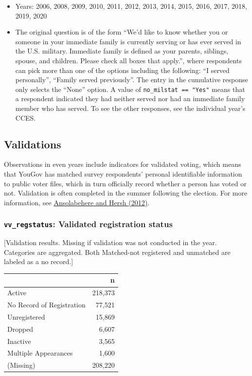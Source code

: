 \documentclass[10pt,article,oneside]{memoir}
\theoremstyle{definition}
\begin{document}
\begin{itemize}
\tightlist
\item
  Years: 2006, 2008, 2009, 2010, 2011, 2012, 2013, 2014, 2015, 2016,
  2017, 2018, 2019, 2020
\item
  The original question is of the form ``We'd like to know whether you
  or someone in your immediate family is currently serving or has ever
  served in the U.S. military. Immediate family is defined as your
  parents, siblings, spouse, and children. Please check all boxes that
  apply.'', where respondents can pick more than one of the options
  including the following: ``I served personally'', ``Family served
  previously''. The entry in the cumulative response only selects the
  ``None'' option. A value of \texttt{no\_milstat\ ==\ "Yes"} means that
  a respondent indicated they had neither served nor had an immediate
  family member who has served. To see the other responses, see the
  individual year's CCES.
\end{itemize}

\newpage

\hypertarget{validations}{%
\subsection{Validations}\label{validations}}

Observations in even years include indicators for validated voting,
which means that YouGov has matched survey respondents' personal
identifiable information to public voter files, which in turn officially
record whether a person has voted or not. Validation is often completed
in the summer following the election. For more information, see
\href{https://doi.org/10.1093/pan/mps023}{Ansolabehere and Hersh
(2012)}.

\hypertarget{vv_regstatus-validated-registration-status}{%
\subsubsection{\texorpdfstring{\texttt{vv\_regstatus}: Validated
registration
status}{vv\_regstatus: Validated registration status}}\label{vv_regstatus-validated-registration-status}}

{[}Validation results. Missing if validation was not conducted in the
year. Categories are aggregated. Both Matched-not registered and
unmatched are labeled as a no record.{]}

\begin{table}[H]
\centering
\begin{tabular}{lr}
\toprule
 & n\\
\midrule
Active & 218,373\\
No Record of Registration & 77,521\\
Unregistered & 15,869\\
Dropped & 6,607\\
Inactive & 3,565\\
Multiple Appearances & 1,600\\
(Missing) & 208,220\\
\bottomrule
\end{tabular}
\end{table}
\end{document}
